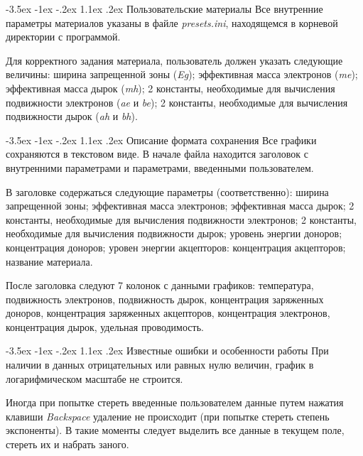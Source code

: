 \documentclass[12pt,a4paper]{extarticle}
\makeatletter
\renewcommand\section{\@startsection{section}{1}{\z@}%
	{-3.5ex \@plus -1ex \@minus -.2ex}%
	{1.1ex \@plus.2ex}%
	{\normalfont\normalfont\bfseries}}%
\makeatother
\begin{document}
\section{Пользовательские материалы}
Все внутренние параметры материалов указаны в файле \textit{presets.ini}, находящемся в корневой директории с программой.

Для корректного задания материала, пользователь должен указать следующие величины: ширина запрещенной зоны (\textit{Eg}); эффективная масса электронов (\textit{me}); эффективная масса дырок (\textit{mh}); 2 константы, необходимые для вычисления подвижности электронов (\textit{ae} и \textit{be}); 2 константы, необходимые для вычисления подвижности дырок (\textit{ah} и \textit{bh}).

\section{Описание формата сохранения}
Все графики сохраняются в текстовом виде. В начале файла находится заголовок с внутренними параметрами и параметрами, введенными пользователем.

В заголовке содержаться следующие параметры (соответственно): ширина запрещенной зоны; эффективная масса электронов; эффективная масса дырок; 2 константы, необходимые для вычисления подвижности электронов; 2 константы, необходимые для вычисления подвижности дырок; уровень энергии доноров; концентрация доноров; уровен энергии акцепторов: концентрация акцепторов; название материала.

После заголовка следуют 7 колонок с данными графиков: температура, подвижность электронов, подвижность дырок, концентрация заряженных доноров, концентрация заряженных акцепторов, концентрация электронов, концентрация дырок, удельная проводимость.

\section{Известные ошибки и особенности работы}
При наличии в данных отрицательных или равных нулю величин, график в логарифмическом масштабе не строится.

Иногда при попытке стереть введенные пользователем данные путем нажатия клавиши \textit{Backspace} удаление не происходит (при попытке стереть степень экспоненты). В такие моменты следует выделить все данные в текущем поле, стереть их и набрать заного.
\end{document}

